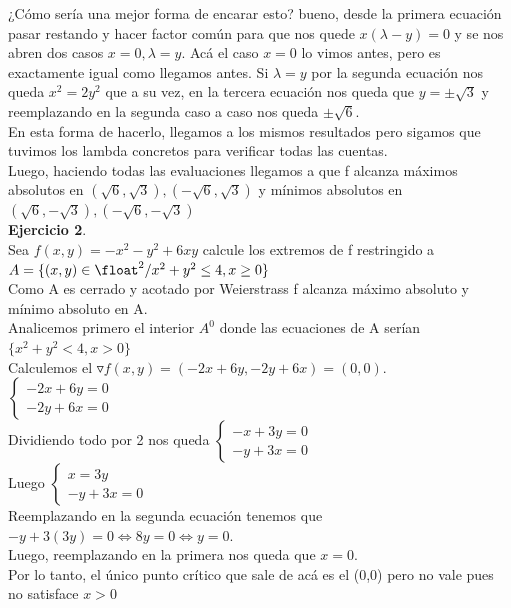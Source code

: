 \documentclass[10pt,a4paper]{article}
\begin{document}
¿Cómo sería una mejor forma de encarar esto? bueno, desde la primera ecuación pasar restando y hacer factor común para que nos quede $x(\lambda - y) = 0$ y se nos abren dos casos $x = 0, \lambda = y$. Acá el caso $x=0$ lo vimos antes, pero es exactamente igual como llegamos antes. Si $\lambda = y$ por la segunda ecuación nos queda $x^{2} = 2y^{2}$ que a su vez, en la tercera ecuación nos queda que $y = \pm \sqrt{3}$ y reemplazando en la segunda caso a caso nos queda $\pm \sqrt{6}$. \\
En esta forma de hacerlo, llegamos a los mismos resultados pero sigamos que tuvimos los lambda concretos para verificar todas las cuentas. \\
Luego, haciendo todas las evaluaciones llegamos a que f alcanza máximos absolutos en $(\sqrt{6}, \sqrt{3}), (-\sqrt{6}, \sqrt{3})$ y mínimos absolutos en $(\sqrt{6}, -\sqrt{3}), (-\sqrt{6}, -\sqrt{3})$ \\
\textbf{Ejercicio 2}. \\
Sea $f(x,y) = -x^{2} - y^{2} + 6xy$ calcule los extremos de f restringido a $A = \{(x,y) \in \float^{2} / x^{2} + y^{2} \le 4, x \ge 0 \}$ \\
Como A es cerrado y acotado por Weierstrass f alcanza máximo absoluto y mínimo absoluto en A. \\
Analicemos primero el interior $A^{0}$ donde las ecuaciones de A serían $\{x^{2} + y^{2} < 4, x > 0\}$ \\
Calculemos el $\triangledown f(x,y) = (-2x + 6y, -2y + 6x) = (0,0)$. \\
$\begin{cases}
   -2x+6y = 0 \\
    -2y+6x = 0
\end{cases}$ \\
Dividiendo todo por 2 nos queda 
$\begin{cases}
   -x+3y = 0 \\
    -y+3x = 0
\end{cases}$ \\
Luego 
$\begin{cases}
   x = 3y \\
    -y+3x = 0
\end{cases}$ \\
Reemplazando en la segunda ecuación tenemos que $-y + 3(3y) = 0 \iff 8y = 0 \iff y = 0$. \\
Luego, reemplazando en la primera nos queda que $x = 0$. \\
Por lo tanto, el único punto crítico que sale de acá es el (0,0) pero no vale pues no satisface $x > 0$ \\
\end{document}
